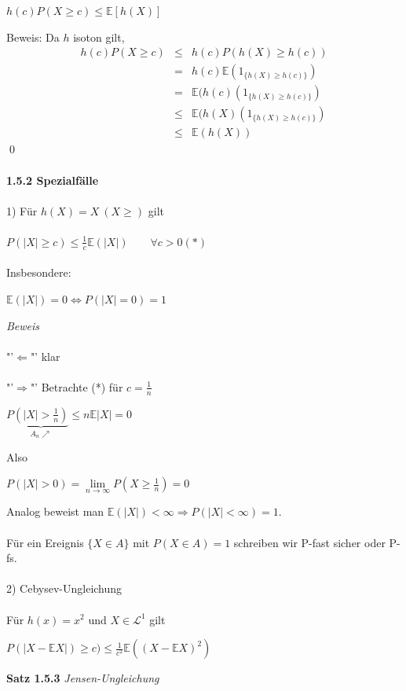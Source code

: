 \documentclass[10pt,a4paper]{report}
\numberwithin{equation}{section}
\numberwithin{figure}{section}
\theoremstyle{plain}
\theoremstyle{definition}
\theoremstyle{plain}
\theoremstyle{definition}
\theoremstyle{remark}
\theoremstyle{plain}
\theoremstyle{plain}
\theoremstyle{plain}
\newcommand{\1}{ \mathbb{1} } %
\begin{document}
\begin{center}
$h(c)P(X\geq c) \leq \mathbb{E}[h(X)]$
\end{center}
Beweis:	Da $h$ isoton gilt,
\begin{eqnarray*}
h(c)P(X\geq c) &\leq & h(c)P(h(X)\geq h(c))\\
&=& h(c) \mathbb{E}(1_{\{h(X)\geq h(c)\}})\\
&=& \mathbb{E}(h(c)(1_{\{h(X)\geq h(c)\}})\\
&\leq &\mathbb{E}(h(X)(1_{\{h(X)\geq h(c)\}})\\
&\leq &\mathbb{E}(h(X))
\end{eqnarray*}\qed\\\\
\textbf{1.5.2 Spezialfälle}\\\\
1) Für $h(X)=X ~(X\geq)$ gilt\\\\
$P(|X|\geq c) \leq \frac{1}{c}\mathbb{E}(|X|) \qquad \forall c >0 (*)$\\\\
Insbesondere:
\begin{center}
$\mathbb{E}(|X|)=0 \Leftrightarrow P(|X|=0)=1 $
\end{center}
\textit{Beweis}\\\\
"'$\Leftarrow$"' klar\\\\
"'$\Rightarrow$"' Betrachte (*) für $c=\frac{1}{n}$
\begin{center}
$P\underbrace{\left(|X|>\frac{1}{n}\right)}_{A_n\nearrow} \leq n\mathbb{E}|X|=0$
\end{center}
Also
\begin{center}
$P(|X|>0)=\lim\limits_{n \to \infty}P\left(X\geq \frac{1}{n}\right)=0$
\end{center}
Analog beweist man $\mathbb{E}(|X|)<\infty \Rightarrow P(|X|<\infty)=1$.\\\\
Für ein Ereignis $\{X\in A\}$ mit $P(X \in A)=1$ schreiben wir P-fast sicher oder P-fs.\\\\
2) Cebysev-Ungleichung\\\\
Für $h(x)=x^2$ und $X \in \mathcal{L}^1$ gilt 
\begin{center}
$P(|X-\mathbb{E}X|)\geq c) \leq \frac{1}{c^2}\mathbb{E}((X-\mathbb{E}X)^2)$
\end{center}
\textbf{Satz 1.5.3} \textit{Jensen-Ungleichung}\\\\
\end{document}
